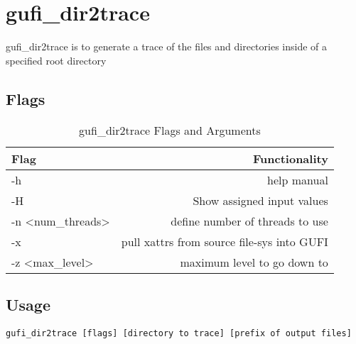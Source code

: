 \section{gufi\_dir2trace}
gufi\_dir2trace is to generate a trace of the files and directories inside of a specified root directory
\subsection{Flags}

\begin{table} [h]
\centering
\begin{tabular}{l|r}
Flag & Functionality \\\hline
-h & help manual \\
-H & Show assigned input values \\
-n \textless num\_threads\textgreater  & define number of threads to use \\
-x & pull xattrs from source file-sys into GUFI \\
-z \textless max\_level\textgreater & maximum level to go down to
\end{tabular}
\caption{\label{fig:Flags_for_dir2trace}gufi\_dir2trace Flags and Arguments}
\end{table}

\subsection{Usage}
\texttt{gufi\_dir2trace [flags] [directory to trace] [prefix of output files]}